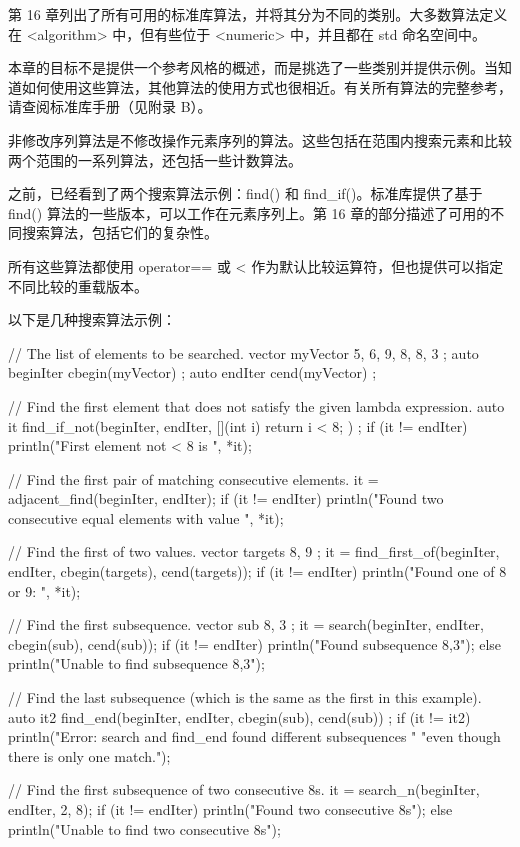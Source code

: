 
第 16 章列出了所有可用的标准库算法，并将其分为不同的类别。大多数算法定义在 <algorithm> 中，但有些位于 <numeric> 中，并且都在 std 命名空间中。

本章的目标不是提供一个参考风格的概述，而是挑选了一些类别并提供示例。当知道如何使用这些算法，其他算法的使用方式也很相近。有关所有算法的完整参考，请查阅标准库手册（见附录 B）。


非修改序列算法是不修改操作元素序列的算法。这些包括在范围内搜索元素和比较两个范围的一系列算法，还包括一些计数算法。


之前，已经看到了两个搜索算法示例：find() 和 find\_if()。标准库提供了基于 find() 算法的一些版本，可以工作在元素序列上。第 16 章的部分描述了可用的不同搜索算法，包括它们的复杂性。

所有这些算法都使用 operator== 或 < 作为默认比较运算符，但也提供可以指定不同比较的重载版本。

以下是几种搜索算法示例：

\begin{cpp}
// The list of elements to be searched.
vector myVector { 5, 6, 9, 8, 8, 3 };
auto beginIter { cbegin(myVector) };
auto endIter { cend(myVector) };

// Find the first element that does not satisfy the given lambda expression.
auto it { find_if_not(beginIter, endIter, [](int i){ return i < 8; }) };
if (it != endIter) {
    println("First element not < 8 is {}", *it);
}

// Find the first pair of matching consecutive elements.
it = adjacent_find(beginIter, endIter);
if (it != endIter) {
    println("Found two consecutive equal elements with value {}", *it);
}

// Find the first of two values.
vector targets { 8, 9 };
it = find_first_of(beginIter, endIter, cbegin(targets), cend(targets));
if (it != endIter) {
    println("Found one of 8 or 9: {}", *it);
}

// Find the first subsequence.
vector sub { 8, 3 };
it = search(beginIter, endIter, cbegin(sub), cend(sub));
if (it != endIter) {
    println("Found subsequence {{8,3}}");
} else {
    println("Unable to find subsequence {{8,3}}");
}

// Find the last subsequence (which is the same as the first in this example).
auto it2 { find_end(beginIter, endIter, cbegin(sub), cend(sub)) };
if (it != it2) {
    println("Error: search and find_end found different subsequences "
        "even though there is only one match.");
}

// Find the first subsequence of two consecutive 8s.
it = search_n(beginIter, endIter, 2, 8);
if (it != endIter) {
    println("Found two consecutive 8s");
} else {
    println("Unable to find two consecutive 8s");
}
\end{cpp}

